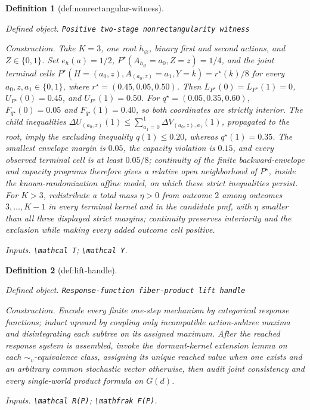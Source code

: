 \documentclass{article}
\newtheorem{definition}{Definition}
\begin{document}
\begin{definition}[def:nonrectangular-witness]\label{def:nonrectangular-witness}
\par\smallskip\noindent\emph{Defined object.} \texttt{Positive two-\allowbreak{}stage nonrectangularity witness}
\par\smallskip\noindent\emph{Construction.} Take \(K=3\), one root \(h_\varnothing\), binary first and second actions, and \(Z\in\{0,1\}\). Set \(e_h(a)=1/2\), \(P^\star(A_{h_\varnothing}=a_0,Z=z)=1/4\), and the joint terminal cells \(P^\star(H=(a_0,z),A_{(a_0,z)}=a_1,Y=k)=r^\star(k)/8\) for every \(a_0,z,a_1\in\{0,1\}\), where \(r^\star=(0.45,0.05,0.50)\). Then \(L_{P^\star}(0)=L_{P^\star}(1)=0\), \(U_{P^\star}(0)=0.45\), and \(U_{P^\star}(1)=0.50\). For \(q^\star=(0.05,0.35,0.60)\), \(F_{q^\star}(0)=0.05\) and \(F_{q^\star}(1)=0.40\), so both coordinates are strictly interior. The child inequalities \(\Delta U_{(a_0,z)}(1)\leq\sum_{a_1=0}^1\Delta V_{(a_0,z),a_1}(1)\), propagated to the root, imply the excluding inequality \(q(1)\leq0.20\), whereas \(q^\star(1)=0.35\). The smallest envelope margin is \(0.05\), the capacity violation is \(0.15\), and every observed terminal cell is at least \(0.05/8\); continuity of the finite backward-envelope and capacity programs therefore gives a relative open neighborhood of \(P^\star\), inside the known-randomization affine model, on which these strict inequalities persist. For \(K>3\), redistribute a total mass \(\eta>0\) from outcome \(2\) among outcomes \(3,\ldots,K-1\) in every terminal kernel and in the candidate pmf, with \(\eta\) smaller than all three displayed strict margins; continuity preserves interiority and the exclusion while making every added outcome cell positive.
\par\smallskip\noindent\emph{Inputs.} \texttt{\textbackslash{}\allowbreak{}mathcal T}; \texttt{\textbackslash{}\allowbreak{}mathcal Y}.
\end{definition}

\begin{definition}[def:lift-handle]\label{def:lift-handle}
\par\smallskip\noindent\emph{Defined object.} \texttt{Response-\allowbreak{}function fiber-\allowbreak{}product lift handle}
\par\smallskip\noindent\emph{Construction.} Encode every finite one-step mechanism by categorical response functions; induct upward by coupling only incompatible action-subtree maxima and disintegrating each subtree on its assigned maximum. After the reached response system is assembled, invoke the dormant-kernel extension lemma on each \(\sim_v\)-equivalence class, assigning its unique reached value when one exists and an arbitrary common stochastic vector otherwise, then audit joint consistency and every single-world product formula on \(G(d)\).
\par\smallskip\noindent\emph{Inputs.} \texttt{\textbackslash{}\allowbreak{}mathcal R(P)}; \texttt{\textbackslash{}\allowbreak{}mathfrak F(P)}.
\end{definition}
\end{document}
